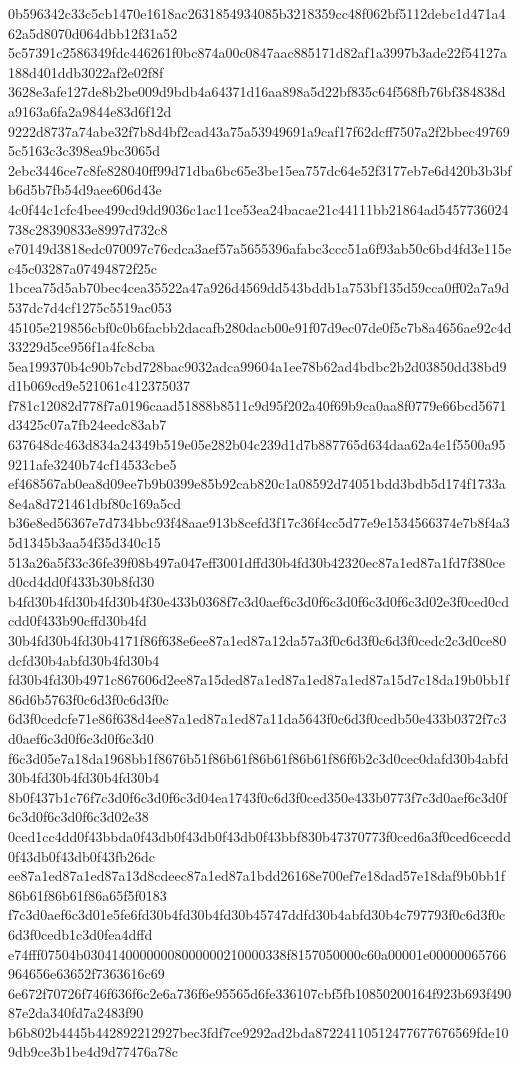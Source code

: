 {0b596342c33c5cb1470e1618ac2631854934085b3218359cc48f062bf5112debc1d471a462a5d8070d064dbb12f31a52
5c57391c2586349fdc446261f0bc874a00c0847aac885171d82af1a3997b3ade22f54127a188d401ddb3022af2e02f8f
3628e3afe127de8b2be009d9bdb4a64371d16aa898a5d22bf835c64f568fb76bf384838da9163a6fa2a9844e83d6f12d
9222d8737a74abe32f7b8d4bf2cad43a75a53949691a9caf17f62dcff7507a2f2bbec497695c5163c3c398ea9bc3065d
2ebc3446ce7c8fe828040ff99d71dba6bc65e3be15ea757dc64e52f3177eb7e6d420b3b3bfb6d5b7fb54d9aee606d43e
4c0f44c1cfc4bee499cd9dd9036c1ac11ce53ea24bacae21c44111bb21864ad5457736024738c28390833e8997d732c8
e70149d3818edc070097c76cdca3aef57a5655396afabc3ccc51a6f93ab50c6bd4fd3e115ec45c03287a07494872f25c
1bcea75d5ab70bec4cea35522a47a926d4569dd543bddb1a753bf135d59cca0ff02a7a9d537dc7d4cf1275c5519ac053
45105e219856cbf0c0b6facbb2dacafb280dacb00e91f07d9ec07de0f5c7b8a4656ae92c4d33229d5ce956f1a4fc8cba
5ea199370b4c90b7cbd728bac9032adca99604a1ee78b62ad4bdbc2b2d03850dd38bd9d1b069cd9e521061c412375037
f781c12082d778f7a0196caad51888b8511c9d95f202a40f69b9ca0aa8f0779e66bcd5671d3425c07a7fb24eedc83ab7
637648dc463d834a24349b519e05e282b04c239d1d7b887765d634daa62a4e1f5500a959211afe3240b74cf14533cbe5
ef468567ab0ea8d09ee7b9b0399e85b92cab820c1a08592d74051bdd3bdb5d174f1733a8e4a8d721461dbf80c169a5cd
b36e8ed56367e7d734bbc93f48aae913b8cefd3f17c36f4cc5d77e9e1534566374e7b8f4a35d1345b3aa54f35d340c15
513a26a5f33c36fe39f08b497a047eff3001dffd30b4fd30b42320ec87a1ed87a1fd7f380ced0cd4dd0f433b30b8fd30
b4fd30b4fd30b4fd30b4f30e433b0368f7c3d0aef6c3d0f6c3d0f6c3d0f6c3d02e3f0ced0cdcdd0f433b90cffd30b4fd
30b4fd30b4fd30b4171f86f638e6ee87a1ed87a12da57a3f0c6d3f0c6d3f0cedc2c3d0ce80dcfd30b4abfd30b4fd30b4
fd30b4fd30b4971c867606d2ee87a15ded87a1ed87a1ed87a1ed87a15d7c18da19b0bb1f86d6b5763f0c6d3f0c6d3f0c
6d3f0cedcfe71e86f638d4ee87a1ed87a1ed87a11da5643f0c6d3f0cedb50e433b0372f7c3d0aef6c3d0f6c3d0f6c3d0
f6c3d05e7a18da1968bb1f8676b51f86b61f86b61f86b61f86f6b2c3d0cec0dafd30b4abfd30b4fd30b4fd30b4fd30b4
8b0f437b1c76f7c3d0f6c3d0f6c3d04ea1743f0c6d3f0ced350e433b0773f7c3d0aef6c3d0f6c3d0f6c3d0f6c3d02e38
0ced1cc4dd0f43bbda0f43db0f43db0f43db0f43bbf830b47370773f0ced6a3f0ced6cecdd0f43db0f43db0f43fb26dc
ee87a1ed87a1ed87a13d8cdeec87a1ed87a1bdd26168e700ef7e18dad57e18daf9b0bb1f86b61f86b61f86a65f5f0183
f7c3d0aef6c3d01e5fe6fd30b4fd30b4fd30b45747ddfd30b4abfd30b4c797793f0c6d3f0c6d3f0cedb1c3d0fea4dffd
e74fff07504b03041400000008000000210000338f8157050000c60a00001e00000065766964656e63652f7363616c69
6e672f70726f746f636f6c2e6a736f6e95565d6fe336107cbf5fb10850200164f923b693f49087e2da340fd7a2483f90
b6b802b4445b442892212927bec3fdf7ce9292ad2bda87224110512477677676569fde109db9ce3b1be4d9d77476a78c
}
